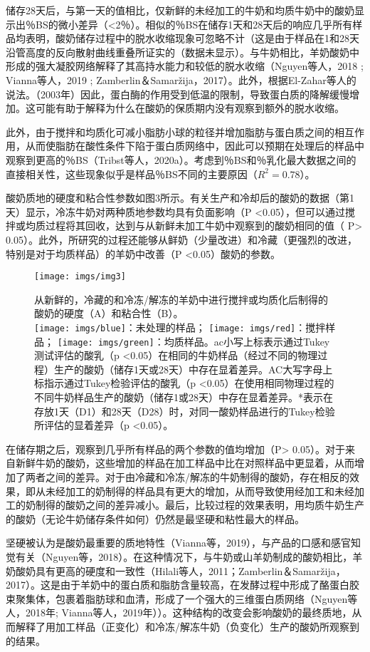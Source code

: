 \documentclass[twocolumn]{ctexart}
\begin{document}
储存28天后，与第一天的值相比，仅新鲜的未经加工的牛奶和均质牛奶中的酸奶显示出％BS的微小差异（<2％）。相似的％BS在储存1天和28天后的响应几乎所有样品均表明，酸奶储存过程中的脱水收缩现象可忽略不计（这是由于样品在1和28天沿管高度的反向散射曲线重叠所证实的（数据未显示）。与牛奶相比，羊奶酸奶中形成的强大凝胶网络解释了其高持水能力和较低的脱水收缩（Nguyen等人，2018 ; Vianna等人，2019 ; Zamberlin＆Samaržija，2017）。此外，根据El-Zahar等人的说法。（2003年）因此，蛋白酶的作用受到低温的限制，导致蛋白质的降解缓慢增加。这可能有助于解释为什么在酸奶的保质期内没有观察到额外的脱水收缩。

此外，由于搅拌和均质化可减小脂肪小球的粒径并增加脂肪与蛋白质之间的相互作用，从而使脂肪在酸性条件下陷于蛋白质网络中，因此可以预期在处理后的样品中观察到更高的％BS（Tribst等人，2020a）。考虑到％BS和％乳化最大数据之间的直接相关性，这些现象似乎是样品％BS不同的主要原因（$R^{2}  = 0.78$）。

酸奶质地的硬度和粘合性参数如图3所示。有关生产和冷却后的酸奶的数据（第1天）显示，冷冻牛奶对两种质地参数均具有负面影响（P <0.05），但可以通过搅拌或均质过程将其回收，达到与从新鲜未加工牛奶中观察到的酸奶相同的值（ P> 0.05）。此外，所研究的过程还能够从鲜奶（少量改进）和冷藏（更强烈的改进，特别是对于均质样品）的羊奶中改善（P <0.05）酸奶的参数。

\begin{figure*}
	\centering
	\texttt{[image: imgs/img3]}
		\caption{从新鲜的，冷藏的和冷冻/解冻的羊奶中进行搅拌或均质化后制得的酸奶的硬度（A）和粘合性（B）。\\\texttt{[image: imgs/blue]}：未处理的样品； \texttt{[image: imgs/red]}：搅拌样品； \texttt{[image: imgs/green]}：均质样品。ac小写上标表示通过Tukey测试评估的酸乳（p <0.05）在相同的牛奶样品（经过不同的物理过程）生产的酸奶（储存1天或28天）中存在显着差异。AC大写字母上标指示通过Tukey检验评估的酸乳（p <0.05）在使用相同物理过程的不同牛奶样品生产的酸奶（储存1或28天）中存在显着差异。*表示在存放1天（D1）和28天（D28）时，对同一酸奶样品进行的Tukey检验所评估的显着差异（p <0.05）。}
\end{figure*}

在储存期之后，观察到几乎所有样品的两个参数的值均增加（P> 0.05）。对于来自新鲜牛奶的酸奶，这些增加的样品在加工样品中比在对照样品中更显着，从而增加了两者之间的差异。对于由冷藏和冷冻/解冻的牛奶制得的酸奶，存在相反的效果，即从未经加工的奶制得的样品具有更大的增加，从而导致使用经加工和未经加工的奶制得的酸奶之间的差异减小。最后，比较过程的效果表明，用均质牛奶生产的酸奶（无论牛奶储存条件如何）仍然是最坚硬和粘性最大的样品。

坚硬被认为是酸奶最重要的质地特性（Vianna等，2019），与产品的口感和感官知觉有关（Nguyen等，2018）。在这种情况下，与牛奶或山羊奶制成的酸奶相比，羊奶酸奶具有更高的硬度和一致性（Hilali等人，2011；Zamberlin＆Samaržija，2017）。这是由于羊奶中的蛋白质和脂肪含量较高，在发酵过程中形成了酪蛋白胶束聚集体，包裹着脂肪球和血清，形成了一个强大的三维蛋白质网络（Nguyen等人，2018年; Vianna等人，2019年））。这种结构的改变会影响酸奶的最终质地，从而解释了用加工样品（正变化）和冷冻/解冻牛奶（负变化）生产的酸奶所观察到的结果。
\end{document}
